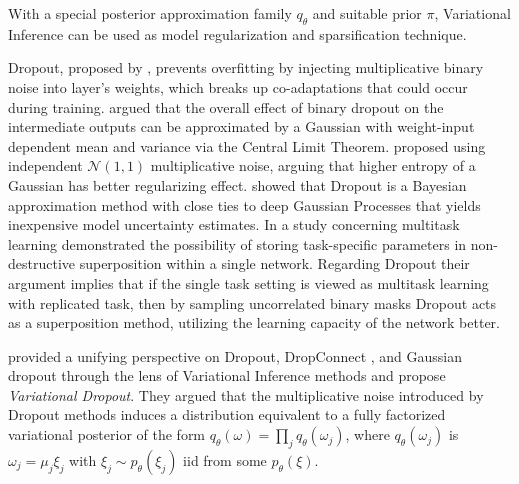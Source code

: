\documentclass[a4paper,10pt,twocolumn]{article}
\begin{document}
With a special posterior approximation family $q_\theta$ and suitable prior $\pi$,
Variational Inference can be used as model regularization and sparsification technique.

Dropout, proposed by \citet{hinton_improving_2012}, prevents overfitting by injecting
multiplicative binary noise into layer's weights, which breaks up co-adaptations that
could occur during training. \citet{wang_fast_2013} argued that the overall effect of
binary dropout on the intermediate outputs can be approximated by a Gaussian with weight-input
dependent mean and variance via the Central Limit Theorem. \citet{srivastava_dropout:_2014}
proposed using independent $\mathcal{N}(1, 1)$ multiplicative noise, arguing that higher
entropy of a Gaussian has better regularizing effect. \citet{gal_dropout_2016} showed
that Dropout is a Bayesian approximation method with close ties to deep Gaussian Processes
that yields inexpensive model uncertainty estimates. In a study concerning multitask learning
\citet{cheung_superposition_2019} demonstrated the possibility of storing task-specific
parameters in non-destructive superposition within a single network. Regarding Dropout
their argument implies that if the single task setting is viewed as multitask learning
with replicated task, then by sampling uncorrelated binary masks Dropout acts as a
superposition method, utilizing the learning capacity of the network better.

%
\citet{kingma_variational_2015} provided a unifying perspective on Dropout, DropConnect
\citep{wan_regularization_2013}, and Gaussian dropout \citep{wang_fast_2013} through
the lens of Variational Inference methods and propose \emph{Variational Dropout}. They
argued that the multiplicative noise introduced by Dropout methods induces a distribution
equivalent to a fully factorized variational posterior of the form $
  q_\theta(\omega) = \prod_j q_{\theta}(\omega_j)
$, where $q_{\theta}(\omega_j)$ is $\omega_j = \mu_j \xi_j$ with $
  \xi_j \sim p_\theta(\xi_j)
$ iid from some $p_\theta(\xi)$.
%
\end{document}
